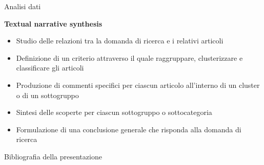 \documentclass{beamer}
\begin{document}
\begin{frame}[t]{\centerline{Analisi dati}}

  \centering
  {\fontsize{16}{22}\textbf{\textcolor{myyellow}{Textual narrative synthesis  \cite{Lucas2007}}}}
\vspace{1cm}
  \begin{itemize}
      \item Studio delle relazioni tra la domanda di ricerca e i relativi articoli
\item Definizione di un criterio attraverso il quale raggruppare, clusterizzare e classificare gli articoli
\item Produzione di commenti specifici per ciascun articolo all'interno di un cluster o di un sottogruppo
\item Sintesi delle scoperte per ciascun sottogruppo o sottocategoria
\item Formulazione di una conclusione generale che risponda alla domanda di ricerca
  \end{itemize}


\end{frame}

\tiny
\begin{frame}{\centerline{Bibliografia della presentazione}}
\begin{multicols}{2}


\end{multicols}
\end{frame}
\end{document}
